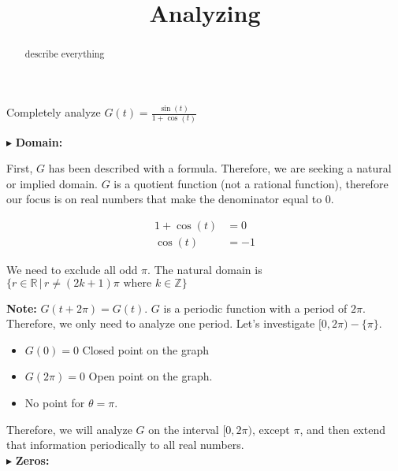 \documentclass{ximera}
\title{Analyzing}
\begin{document}
\begin{abstract}
describe everything
\end{abstract}
\maketitle







Completely analyze $G(t) = \frac{\sin(t)}{1 + \cos(t)}$

$\blacktriangleright$  \textbf{\textcolor{blue!55!black}{Domain: }} 

First, $G$ has been described with a formula.  Therefore, we are seeking a natural or implied domain. $G$ is a quotient function (not a rational function), therefore our focus is on real numbers that make the denominator equal to $0$.



\begin{align*}
1  + \cos(t) & = 0 \\
\cos(t) & = -1
\end{align*}


We need to exclude all odd $\pi$.  The natural domain is $\{  r \in \mathbb{R} \, | \, r \ne (2k+1)\pi \text{ where } k \in \mathbb{Z}   \}$



\textbf{Note:} $G(t+2\pi) = G(t)$.  $G$ is a periodic function with a period of $2\pi$.  Therefore, we only need to analyze one period.  Let's investigate $[0, 2\pi) - \{ \pi \}$.

\begin{itemize}
\item $G(0) = 0$   Closed point on the graph
\item $G(2\pi) = 0$  Open point on the graph.
\item No point for $\theta = \pi$.
\end{itemize}



Therefore, we will analyze $G$ on the interval $[0, 2\pi)$, except $\pi$, and then extend that information periodically to all real numbers.\\










$\blacktriangleright$ \textbf{\textcolor{blue!55!black}{Zeros: }}  
\end{document}
